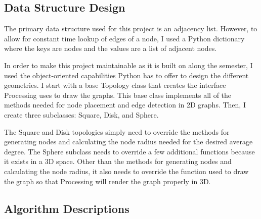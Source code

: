 \documentclass{article}
\begin{document}
    \subsection{Data Structure Design}
    The primary data structure used for this project is an adjacency list. However, to allow for constant time lookup of edges of a node, I used a Python dictionary where the keys are nodes and the values are a list of adjacent nodes.
    \par
    In order to make this project maintainable as it is built on along the semester, I used the object-oriented capabilities Python has to offer to design the different geometries. I start with a base Topology class that creates the interface Processing uses to draw the graphs. This base class implements all of the methods needed for node placement and edge detection in 2D graphs. Then, I create three subclasses: Square, Disk, and Sphere.
    \par
    The Square and Disk topologies simply need to override the methods for generating nodes and calculating the node radius needed for the desired average degree. The Sphere subclass needs to override a few additional functions because it exists in a 3D space. Other than the methods for generating nodes and calculating the node radius, it also needs to override the function used to draw the graph so that Processing will render the graph properly in 3D.

    \subsection{Algorithm Descriptions}
\end{document}
